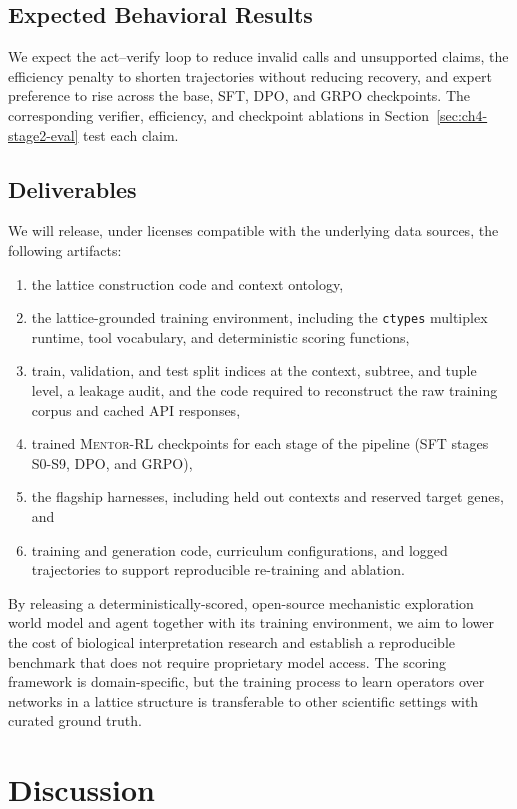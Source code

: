 \documentclass[thesis,letterpaper,12pt]{utthesis}
\begin{document}
\subsection{Expected Behavioral Results}
We expect the act--verify loop to reduce invalid calls and unsupported claims, the efficiency penalty to shorten trajectories without reducing recovery, and expert preference to rise across the base, SFT, DPO, and GRPO checkpoints. The corresponding verifier, efficiency, and checkpoint ablations in Section~\ref{sec:ch4-stage2-eval} test each claim.

\subsection{Deliverables}\label{sec:ch4-deliverables}
We will release, under licenses compatible with the underlying data sources, the following artifacts:
\begin{enumerate}
    \item the lattice construction code and context ontology,
    \item the lattice-grounded training environment, including the \texttt{ctypes} multiplex runtime, tool vocabulary, and deterministic scoring functions,
    \item train, validation, and test split indices at the context, subtree, and tuple level, a leakage audit, and the code required to reconstruct the raw training corpus and cached API responses,
    \item trained \textsc{Mentor-RL} checkpoints for each stage of the pipeline (SFT stages S0-S9, DPO, and GRPO),
    \item the flagship harnesses, including held out contexts and reserved target genes, and
    \item training and generation code, curriculum configurations, and logged trajectories to support reproducible re-training and ablation.
\end{enumerate}

By releasing a deterministically-scored, open-source mechanistic exploration world model and agent together with its training environment, we aim to lower the cost of biological interpretation research and establish a reproducible benchmark that does not require proprietary model access. The scoring framework is domain-specific, but the training process to learn operators over networks in a lattice structure is transferable to other scientific settings with curated ground truth.

\section{Discussion}
\end{document}
